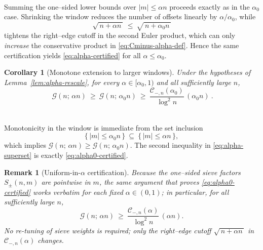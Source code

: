 \documentclass[11pt]{article}
\makeatletter
\theoremstyle{inline}
\newtheorem*{remark}{Remark}
\theoremstyle{break}
\renewenvironment{proof}[1][\proofname]{%
  \par\pushQED{\qed}%
  \normalfont \topsep6\p@\@plus6\p@\relax
  \trivlist
  \item[\hskip\labelsep
        \itshape
    #1\@addpunct{.}]\mbox{}\\  %
}{%
  \popQED\endtrivlist\@endpefalse
}
\theoremstyle{break}
\theoremstyle{break}
\theoremstyle{break}
\theoremstyle{break}
\theoremstyle{break}
\newtheorem{corollary}{Corollary}
\theoremstyle{break}
\theoremstyle{inline}
\newcommand{\CminusProductAlpha}[2]{\mathcal{C}_{-,#2}\!\left(#1\right)}
\makeatother
\begin{document}
\begin{proof}
Summing the one–sided lower bounds over \(|m|\le \alpha n\) proceeds exactly as in the \(\alpha_0\) case. Shrinking the window reduces the number of offsets linearly by \(\alpha/\alpha_0\), while
\begin{equation}\label{eq:right-edge-shift}
\sqrt{\,n+\alpha n\,}\ \le\ \sqrt{\,n+\alpha_0 n\,}
\end{equation}
tightens the right–edge cutoff in the second Euler product, which can only \emph{increase} the conservative product in \eqref{eq:Cminus-alpha-def}. Hence the same certification yields \eqref{eq:alpha-certified} for all \(\alpha\le\alpha_0\).
\end{proof}

\begin{corollary}[Monotone extension to larger windows]
\label{cor:alpha-superset}
Under the hypotheses of Lemma~\ref{lem:alpha-rescale}, for every \(\alpha\in[\alpha_0,1)\) and all sufficiently large \(n\),
\begin{equation}\label{eq:alpha-superset}
\boxed{\ \ \mathcal G(n;\,\alpha n)\ \ge\ \mathcal G(n;\,\alpha_0 n)\ \ge\ \frac{\CminusProductAlpha{\alpha_0}{n}}{\log^2 n}\,(\alpha_0 n)\ .\ }
\end{equation}
\end{corollary}

\begin{proof}
Monotonicity in the window is immediate from the set inclusion
\begin{equation}\label{eq:window-inclusion}
\{\,|m|\le \alpha_0 n\,\}\ \subseteq\ \{\,|m|\le \alpha n\,\},
\end{equation}
which implies \(\mathcal G(n;\,\alpha n)\ge \mathcal G(n;\,\alpha_0 n)\). The second inequality in \eqref{eq:alpha-superset} is exactly \eqref{eq:alpha0-certified}.
\end{proof}

\begin{remark}[Uniform-in-\(\alpha\) certification]
\label{rem:alpha-uniform}
Because the one–sided sieve factors \(S_\pm(n,m)\) are pointwise in \(m\), the same argument that proves \eqref{eq:alpha0-certified} works verbatim for each fixed \(\alpha\in(0,1)\); in particular, for all sufficiently large \(n\),
\begin{equation}\label{eq:alpha-uniform}
\mathcal G(n;\,\alpha n)\ \ge\ \frac{\CminusProductAlpha{\alpha}{n}}{\log^2 n}\,(\alpha n).
\end{equation}
No re-tuning of sieve weights is required; only the right–edge cutoff \(\sqrt{\,n+\alpha n\,}\) in \(\CminusProductAlpha{\alpha}{n}\) changes.
\end{remark}
\end{document}
